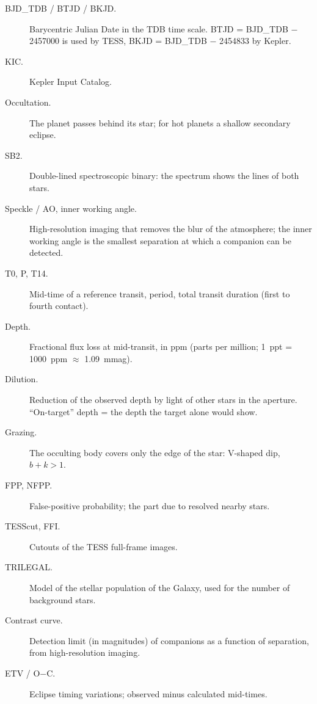 \documentclass[11pt,a4paper]{report}
\begin{document}
\begin{description}
\item[BJD\_TDB / BTJD / BKJD.] Barycentric Julian Date in the TDB time scale.
BTJD = BJD\_TDB $-$ 2457000 is used by TESS, BKJD = BJD\_TDB $-$ 2454833 by
Kepler.
\item[KIC.] Kepler Input Catalog.
\item[Occultation.] The planet passes behind its star; for hot planets a
shallow secondary eclipse.
\item[SB2.] Double-lined spectroscopic binary: the spectrum shows the lines of
both stars.
\item[Speckle / AO, inner working angle.] High-resolution imaging that removes
the blur of the atmosphere; the inner working angle is the smallest
separation at which a companion can be detected.
\item[T0, P, T14.] Mid-time of a reference transit, period, total transit
duration (first to fourth contact).
\item[Depth.] Fractional flux loss at mid-transit, in ppm (parts per million;
1~ppt = 1000~ppm $\approx$ 1.09~mmag).
\item[Dilution.] Reduction of the observed depth by light of other stars in
the aperture. ``On-target'' depth = the depth the target alone would show.
\item[Grazing.] The occulting body covers only the edge of the star:
V-shaped dip, $b + k > 1$.
\item[FPP, NFPP.] False-positive probability; the part due to resolved
nearby stars.
\item[TESScut, FFI.] Cutouts of the TESS full-frame images.
\item[TRILEGAL.] Model of the stellar population of the Galaxy, used for the
number of background stars.
\item[Contrast curve.] Detection limit (in magnitudes) of companions as a
function of separation, from high-resolution imaging.
\item[ETV / O$-$C.] Eclipse timing variations; observed minus calculated
mid-times.
\end{description}
\end{document}
